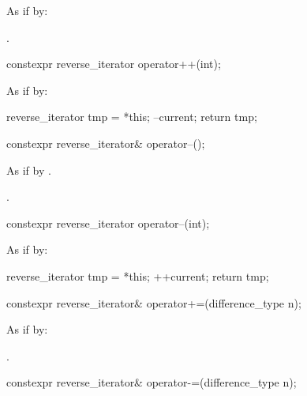 \begin{itemdescr}
\pnum
\effects
As if by: 

\pnum
\returns
{}.
\end{itemdescr}

%
\begin{itemdecl}
constexpr reverse_iterator operator++(int);
\end{itemdecl}

\begin{itemdescr}
\pnum
\effects
As if by:
\begin{codeblock}
reverse_iterator tmp = *this;
--current;
return tmp;
\end{codeblock}
\end{itemdescr}

%
\begin{itemdecl}
constexpr reverse_iterator& operator--();
\end{itemdecl}

\begin{itemdescr}
\pnum
\effects
As if by .

\pnum
\returns
{}.
\end{itemdescr}

%
\begin{itemdecl}
constexpr reverse_iterator operator--(int);
\end{itemdecl}

\begin{itemdescr}
\pnum
\effects
As if by:
\begin{codeblock}
reverse_iterator tmp = *this;
++current;
return tmp;
\end{codeblock}
\end{itemdescr}

%
\begin{itemdecl}
constexpr reverse_iterator& operator+=(difference_type n);
\end{itemdecl}

\begin{itemdescr}
\pnum
\effects
As if by: 

\pnum
\returns
{}.
\end{itemdescr}

%
\begin{itemdecl}
constexpr reverse_iterator& operator-=(difference_type n);
\end{itemdecl}

